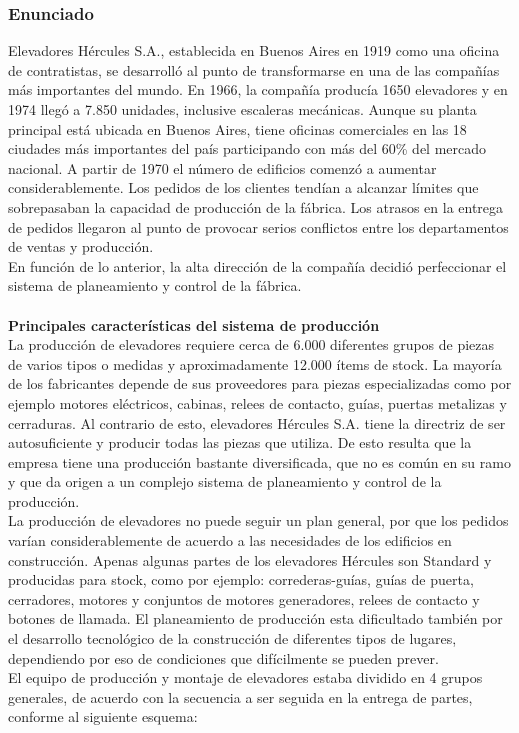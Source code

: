 \documentclass[a4paper,10pt]{article}
\begin{document}
		\subsubsection{Enunciado}
		Elevadores Hércules S.A., establecida en Buenos Aires en 1919 como una oficina de
contratistas, se desarrolló al punto de transformarse en una de las compañías más
importantes del mundo. En 1966, la compañía producía 1650 elevadores y en 1974
llegó a 7.850 unidades, inclusive escaleras mecánicas. Aunque su planta principal está
ubicada en Buenos Aires, tiene oficinas comerciales en las 18 ciudades más importantes
del país participando con más del 60\% del mercado nacional. A partir de 1970 el número
de edificios comenzó a aumentar considerablemente. Los pedidos de los clientes tendían
a alcanzar límites que sobrepasaban la capacidad de producción de la fábrica. Los
atrasos en la entrega de pedidos llegaron al punto de provocar serios conflictos entre los
departamentos de ventas y producción.\\
En función de lo anterior, la alta dirección de la compañía decidió perfeccionar el
sistema de planeamiento y control de la fábrica.\\ \\
\textbf{Principales características del sistema de producción}\\
La producción de elevadores requiere cerca de 6.000 diferentes grupos de piezas de
varios tipos o medidas y aproximadamente 12.000 ítems de stock. La mayoría de los
fabricantes depende de sus proveedores para piezas especializadas como por ejemplo
motores eléctricos, cabinas, relees de contacto, guías, puertas metalizas y cerraduras.
Al contrario de esto, elevadores Hércules S.A. tiene la directriz de ser autosuficiente y
producir todas las piezas que utiliza. De esto resulta que la empresa tiene una producción
bastante diversificada, que no es común en su ramo y que da origen a un complejo
sistema de planeamiento y control de la producción.\\
La producción de elevadores no puede seguir un plan general, por que los pedidos
varían considerablemente de acuerdo a las necesidades de los edificios en construcción.
Apenas algunas partes de los elevadores Hércules son Standard y producidas para stock,
como por ejemplo: correderas-guías, guías de puerta, cerradores, motores y conjuntos de
motores generadores, relees de contacto y botones de llamada. El planeamiento de
producción esta dificultado también por el desarrollo tecnológico de la construcción de
diferentes tipos de lugares, dependiendo por eso de condiciones que difícilmente se
pueden prever.\\
El equipo de producción y montaje de elevadores estaba dividido en 4 grupos generales,
de acuerdo con la secuencia a ser seguida en la entrega de partes, conforme al
siguiente esquema:
\end{document}
